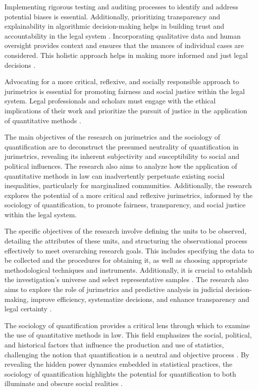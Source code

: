 Implementing rigorous testing and auditing processes to identify and address potential biases is essential. Additionally, prioritizing transparency and explainability in algorithmic decision-making helps in building trust and accountability in the legal system \cite{10.1007/s11186-021-09453-1,10.3390/fi9040068}. Incorporating qualitative data and human oversight provides context and ensures that the nuances of individual cases are considered. This holistic approach helps in making more informed and just legal decisions \cite{10.1007/s11186-021-09453-1,10.3390/fi9040068}.

Advocating for a more critical, reflexive, and socially responsible approach to jurimetrics is essential for promoting fairness and social justice within the legal system. Legal professionals and scholars must engage with the ethical implications of their work and prioritize the pursuit of justice in the application of quantitative methods \cite{10.1007/s11186-021-09453-1,10.3390/fi9040068}.

The main objectives of the research on jurimetrics and the sociology of quantification are to deconstruct the presumed neutrality of quantification in jurimetrics, revealing its inherent subjectivity and susceptibility to social and political influences. The research also aims to analyze how the application of quantitative methods in law can inadvertently perpetuate existing social inequalities, particularly for marginalized communities. Additionally, the research explores the potential of a more critical and reflexive jurimetrics, informed by the sociology of quantification, to promote fairness, transparency, and social justice within the legal system.

The specific objectives of the research involve defining the units to be observed, detailing the attributes of these units, and structuring the observational process effectively to meet overarching research goals. This includes specifying the data to be collected and the procedures for obtaining it, as well as choosing appropriate methodological techniques and instruments. Additionally, it is crucial to establish the investigation's universe and select representative samples \cite{calvo2024, calvo2024}. The research also aims to explore the role of jurimetrics and predictive analysis in judicial decision-making, improve efficiency, systematize decisions, and enhance transparency and legal certainty \cite{silva2023}.

The sociology of quantification provides a critical lens through which to examine the use of quantitative methods in law. This field emphasizes the social, political, and historical factors that influence the production and use of statistics, challenging the notion that quantification is a neutral and objective process \cite{10.1007/978-3-319-44000-2_15,10.3390/fi9040068}. By revealing the hidden power dynamics embedded in statistical practices, the sociology of quantification highlights the potential for quantification to both illuminate and obscure social realities \cite{10.1007/978-3-319-44000-2_15,10.3390/fi9040068}.


